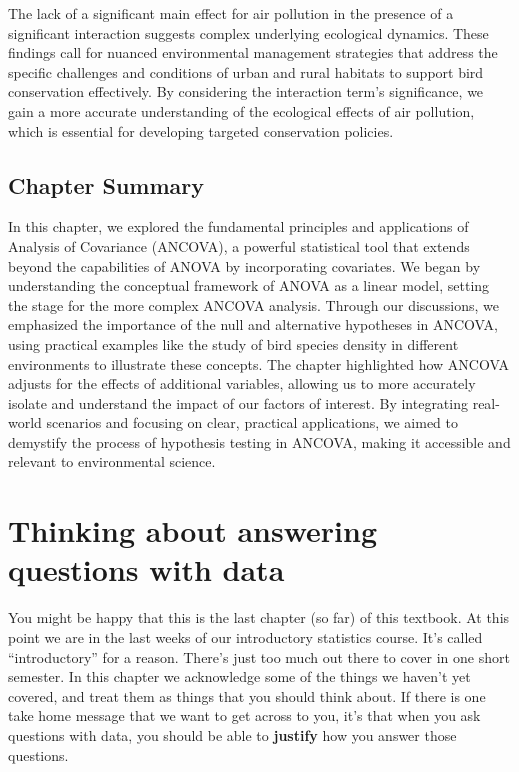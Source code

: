 \documentclass[
  letterpaper,
  DIV=11,
  numbers=noendperiod]{scrreprt}
\begin{document}
The lack of a significant main effect for air pollution in the presence
of a significant interaction suggests complex underlying ecological
dynamics. These findings call for nuanced environmental management
strategies that address the specific challenges and conditions of urban
and rural habitats to support bird conservation effectively. By
considering the interaction term's significance, we gain a more accurate
understanding of the ecological effects of air pollution, which is
essential for developing targeted conservation policies.

\section{Chapter Summary}\label{chapter-summary-1}

In this chapter, we explored the fundamental principles and applications
of Analysis of Covariance (ANCOVA), a powerful statistical tool that
extends beyond the capabilities of ANOVA by incorporating covariates. We
began by understanding the conceptual framework of ANOVA as a linear
model, setting the stage for the more complex ANCOVA analysis. Through
our discussions, we emphasized the importance of the null and
alternative hypotheses in ANCOVA, using practical examples like the
study of bird species density in different environments to illustrate
these concepts. The chapter highlighted how ANCOVA adjusts for the
effects of additional variables, allowing us to more accurately isolate
and understand the impact of our factors of interest. By integrating
real-world scenarios and focusing on clear, practical applications, we
aimed to demystify the process of hypothesis testing in ANCOVA, making
it accessible and relevant to environmental science.


\chapter{Thinking about answering questions with
data}\label{thinking-about-answering-questions-with-data}

You might be happy that this is the last chapter (so far) of this
textbook. At this point we are in the last weeks of our introductory
statistics course. It's called ``introductory'' for a reason. There's
just too much out there to cover in one short semester. In this chapter
we acknowledge some of the things we haven't yet covered, and treat them
as things that you should think about. If there is one take home message
that we want to get across to you, it's that when you ask questions with
data, you should be able to \textbf{justify} how you answer those
questions.
\end{document}
